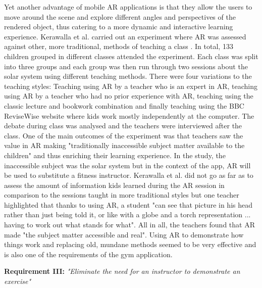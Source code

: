 \documentclass{l4proj}
\begin{document}
Yet another advantage of mobile AR applications is that they allow the users to move around the scene and explore different angles and perspectives of the rendered object, thus catering to a more dynamic and interactive learning experience\cite{fitzgerald_augmented_2013}\cite{dede_immersive_2009}. Kerawalla et al. carried out an experiment where AR was assessed against other, more traditional, methods of teaching a class \cite{kerawalla_making_2006}. In total, 133 children grouped in different classes attended the experiment. Each class was split into three groups and each group was then run through two sessions about the solar system using different teaching methods. There were four variations to the teaching styles: Teaching using AR by a teacher who is an expert in AR, teaching using AR by a teacher who had no prior experience with AR, teaching using the classic lecture and bookwork combination and finally teaching using the BBC ReviseWise website where kids work mostly independently at the computer. The debate during class was analysed and the teachers were interviewed after the class. One of the main outcomes of the experiment was that teachers saw the value in AR making "traditionally inaccessible subject matter available to the children"\cite{kerawalla_making_2006} and thus enriching their learning experience. In the study, the inaccessible subject was the solar system but in the context of the app, AR will be used to substitute a fitness instructor. Kerawalla et al. did not go as far as to assess the amount of information kids learned during the AR session in comparison to the sessions taught in more traditional styles but one teacher highlighted that thanks to using AR, a student "can see that picture in his head rather than just being told it, or like with a globe and a torch representation ... having to work out what stands for what"\cite{kerawalla_making_2006}. All in all, the teachers found that AR made "the  subject  matter  accessible  and real". Using AR to demonstrate how things work and replacing old, mundane methods seemed to be very effective and is also one of the requirements of the gym application.  

\textbf{Requirement III:} \textit{"Eliminate the need for an instructor to demonstrate an exercise"}  \label{requirement_III}
\end{document}
